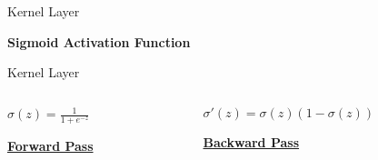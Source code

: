 
\begin{slide}{Kernel Layer}
  \pause

  \textbf{Sigmoid Activation Function}
\end{slide}

\begin{slide}{Kernel Layer}
\begin{columns}
  \begin{column}{0.5\textwidth}
    \centering
    \pause
    {\large$\sigma(z) = \frac{1}{1 + e^{-z}}$}

    \vspace{0.5cm}
    \href{https://eigen.tuxfamily.org/dox/unsupported/TensorFunctors_8h_source.html}{\textbf{Forward Pass}}
  \end{column}
  \begin{column}{0.5\textwidth}
    \pause
    {\large$\sigma'(z) = \sigma(z)(1 - \sigma(z))$}

    \vspace{0.48cm}
    \hspace{0.4cm}\href{https://github.com/tensorflow/tensorflow/blob/2c8d0dca978a246f54c506aae4587dbce5d3bcf0/tensorflow/core/kernels/cwise_ops_gradients.h\#L51}{\textbf{Backward Pass}}
  \end{column}
\end{columns}
\end{slide}

